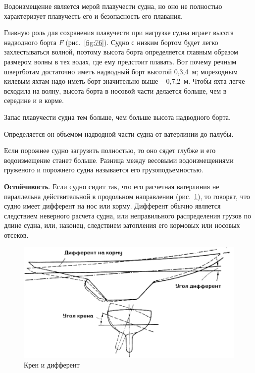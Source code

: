 \documentclass[a4paper, 12pt, twoside, final]{scrbook}
\begin{document}
Водоизмещение является мерой плавучести судна, но оно не полностью характеризует плавучесть его и безопасность его плавания.

Главную роль для сохранения плавучести при нагрузке судна играет высота надводного борта $F$ (рис.~\ref{fig:76}). Судно с низким бортом будет легко захлестываться волной, поэтому высота борта определяется главным образом размером волны в тех водах, где ему предстоит плавать. Вот почему речным швертботам достаточно иметь надводный борт высотой 0,3,4~м; мореходным килевым яхтам надо иметь борт значительно выше \--- 0,7,2~м. Чтобы яхта легче всходила на волну, высота борта в носовой части делается больше, чем в середине и в корме.

Запас плавучести судна тем больше, чем больше высота надводного борта.

Определяется он объемом надводной части судна от ватерлинии до палубы.

Если порожнее судно загрузить полностью, то оно сядет глубже и его водоизмещение станет больше. Разница между весовыми водоизмещениями груженого и порожнего судна называется его грузоподъемностью.

\textbf{Остойчивость}. Если судно сидит так, что его расчетная ватерлиния не параллельна действительной в продольном направлении (рис.~\ref{fig:77}), то говорят, что судно имеет дифферент на нос или корму. Дифферент обычно является следствием неверного расчета судна, или неправильного распределения грузов по длине судна, или, наконец, следствием затопления его кормовых или носовых отсеков.

\begin{figure}[htbp]
   \centering
   \includegraphics{77_Kren_i_different} %
   \caption{Крен и дифферент}
   \label{fig:77}
\end{figure}
\end{document}
